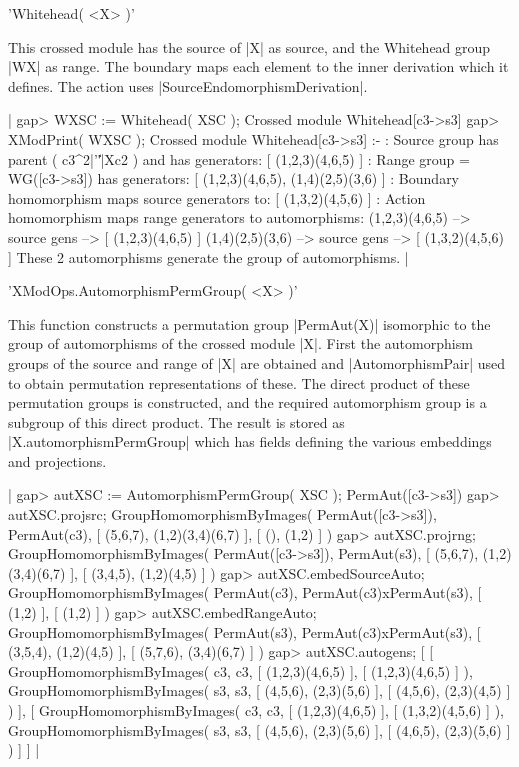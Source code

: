 %

'Whitehead( <X> )'

This crossed module has the source of |X| as source, and the Whitehead
group  |WX|  as range.  The  boundary maps  each  element to the inner
derivation      which        it   defines.       The     action   uses
|SourceEndomorphismDerivation|.

|    gap> WXSC := Whitehead( XSC );
    Crossed module Whitehead[c3->s3]
    gap> XModPrint( WXSC );
    Crossed module Whitehead[c3->s3] :- 
    : Source group has parent ( c3^2|'\|'|Xc2 ) and has generators:
      [ (1,2,3)(4,6,5) ]
    : Range group = WG([c3->s3]) has generators:
      [ (1,2,3)(4,6,5), (1,4)(2,5)(3,6) ]
    : Boundary homomorphism maps source generators to:
      [ (1,3,2)(4,5,6) ]
    : Action homomorphism maps range generators to automorphisms:
      (1,2,3)(4,6,5) --> { source gens --> [ (1,2,3)(4,6,5) ] }
      (1,4)(2,5)(3,6) --> { source gens --> [ (1,3,2)(4,5,6) ] }
      These 2 automorphisms generate the group of automorphisms.  |

%

'XModOps.AutomorphismPermGroup( <X> )'

This function constructs  a permutation group  |PermAut(X)| isomorphic
to the  group of automorphisms  of the crossed  module |X|.  First the
automorphism groups  of the source and  range of  |X| are obtained and
|AutomorphismPair|  used to   obtain  permutation  representations  of
these.  The direct product of these permutation groups is constructed,
and the required  automorphism  group is  a  subgroup of   this direct
product.  The result is  stored as |X.automorphismPermGroup| which has
fields defining the various embeddings and projections.

|    gap> autXSC := AutomorphismPermGroup( XSC );
    PermAut([c3->s3])
    gap> autXSC.projsrc;
    GroupHomomorphismByImages( PermAut([c3->s3]), PermAut(c3), 
    [ (5,6,7), (1,2)(3,4)(6,7) ], [ (), (1,2) ] )
    gap> autXSC.projrng;
    GroupHomomorphismByImages( PermAut([c3->s3]), PermAut(s3), 
    [ (5,6,7), (1,2)(3,4)(6,7) ], [ (3,4,5), (1,2)(4,5) ] )
    gap> autXSC.embedSourceAuto;
    GroupHomomorphismByImages( PermAut(c3), PermAut(c3)xPermAut(s3),
        [ (1,2) ], [ (1,2) ] )
    gap> autXSC.embedRangeAuto;
    GroupHomomorphismByImages( PermAut(s3), PermAut(c3)xPermAut(s3), 
    [ (3,5,4), (1,2)(4,5) ], [ (5,7,6), (3,4)(6,7) ] )
    gap> autXSC.autogens;
    [ [ GroupHomomorphismByImages( c3, c3, [ (1,2,3)(4,6,5) ],
            [ (1,2,3)(4,6,5) ] ), GroupHomomorphismByImages( s3, s3, 
            [ (4,5,6), (2,3)(5,6) ], [ (4,5,6), (2,3)(4,5) ] ) ], 
      [ GroupHomomorphismByImages( c3, c3, [ (1,2,3)(4,6,5) ], 
            [ (1,3,2)(4,5,6) ] ), GroupHomomorphismByImages( s3, s3, 
            [ (4,5,6), (2,3)(5,6) ], [ (4,6,5), (2,3)(5,6) ] ) ] ]   |


